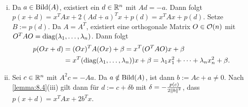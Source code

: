 \begin{beweis}
	\mbox{} \\[-.9cm]
	\begin{enumerate}[(i)]
		\item Da $a \in \operatorname{Bild}(A)$, existiert ein $d \in \mathbb{R}^n$ mit $Ad = -a$.
		Dann folgt $p(x+d) = x^TAx + 2(Ad+a)^Tx + p(d) = x^T Ax + p(d)$.
		Setze $B := p(d)$.
		Da $A = A^T$, existiert eine orthogonale Matrix $O \in \mathcal{O}(n)$ mit $O^TAO = \operatorname{diag}(\lambda_1,\dots,\lambda_n)$.
		Dann folgt
		\begin{align*}
			p(Ox+d) &= (Ox)^TA(Ox) + \beta = x^T(O^TAO)x + \beta \\
			&= x^T(\operatorname{diag}(\lambda_1,\dots,\lambda_n))x + \beta = \lambda_1 x_1^2 + \dots + \lambda_n x_n^2 + \beta.
		\end{align*}
		\item Sei $c \in \mathbb{R}^n$ mit $A^2c = -Aa$.
		Da $a \notin \operatorname{Bild}(A)$, ist dann $b := Ac + a \neq 0$.
		Nach \autoref{lemma:8.4}(iii) gilt dann für $d := c + \delta b$ mit $\delta = - \frac{p(c)}{2 \left\lVert b\right\rVert^2}$, dass $p(x+d) = x^TAx + 2b^Tx$.
		

\end{enumerate}
\end{beweis}
